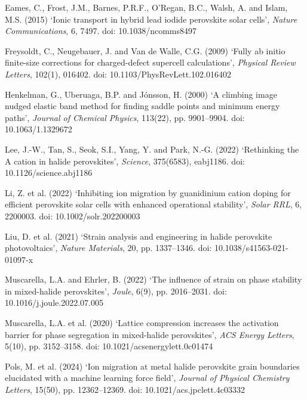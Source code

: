 \documentclass[11pt,a4paper]{article}
\begin{document}
\begin{list}{}{\setlength{\itemindent}{-1.2em}\setlength{\leftmargin}{1.2em}\setlength{\itemsep}{0.25em}\small}
\item Eames, C., Frost, J.M., Barnes, P.R.F., O'Regan, B.C., Walsh, A. and Islam, M.S.
(2015) `Ionic transport in hybrid lead iodide perovskite solar cells', \emph{Nature
Communications}, 6, 7497. doi: 10.1038/ncomms8497

\item Freysoldt, C., Neugebauer, J. and Van de Walle, C.G. (2009) `Fully ab initio
finite-size corrections for charged-defect supercell calculations', \emph{Physical
Review Letters}, 102(1), 016402. doi: 10.1103/PhysRevLett.102.016402

\item Henkelman, G., Uberuaga, B.P. and J\'onsson, H. (2000) `A climbing image nudged
elastic band method for finding saddle points and minimum energy paths', \emph{Journal
of Chemical Physics}, 113(22), pp. 9901--9904. doi: 10.1063/1.1329672

\item Lee, J.-W., Tan, S., Seok, S.I., Yang, Y. and Park, N.-G. (2022) `Rethinking the
A cation in halide perovskites', \emph{Science}, 375(6583), eabj1186. doi:
10.1126/science.abj1186

\item Li, Z. et al. (2022) `Inhibiting ion migration by guanidinium cation doping for
efficient perovskite solar cells with enhanced operational stability', \emph{Solar
RRL}, 6, 2200003. doi: 10.1002/solr.202200003

\item Liu, D. et al. (2021) `Strain analysis and engineering in halide perovskite
photovoltaics', \emph{Nature Materials}, 20, pp. 1337--1346. doi:
10.1038/s41563-021-01097-x

\item Muscarella, L.A. and Ehrler, B. (2022) `The influence of strain on phase
stability in mixed-halide perovskites', \emph{Joule}, 6(9), pp. 2016--2031. doi:
10.1016/j.joule.2022.07.005

\item Muscarella, L.A. et al. (2020) `Lattice compression increases the activation
barrier for phase segregation in mixed-halide perovskites', \emph{ACS Energy Letters},
5(10), pp. 3152--3158. doi: 10.1021/acsenergylett.0c01474

\item Pols, M. et al. (2024) `Ion migration at metal halide perovskite grain
boundaries elucidated with a machine learning force field', \emph{Journal of Physical
Chemistry Letters}, 15(50), pp. 12362--12369. doi: 10.1021/acs.jpclett.4c03332


\end{list}
\end{document}
